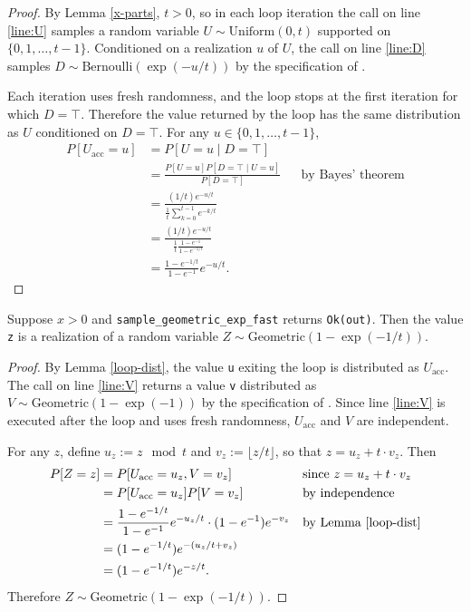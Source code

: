 \documentclass{article}
\begin{document}
\begin{proof}
    By Lemma \ref{x-parts}, $t > 0$, so in each loop iteration the call on line \ref{line:U} samples
    a random variable $U \sim \textrm{Uniform}(0, t)$ supported on $\{0, 1, \dots, t - 1\}$.
    Conditioned on a realization $u$ of $U$, the call on line \ref{line:D} samples
    $D \sim \textrm{Bernoulli}(\exp(-u/t))$ by the specification of
    .

    Each iteration uses fresh randomness, and the loop stops at the first iteration for which $D = \top$.
    Therefore the value returned by the loop has the same distribution as $U$ conditioned on $D = \top$.
    For any $u \in \{0, 1, \dots, t - 1\}$,
    \begin{align*}
        P[U_{\mathrm{acc}} = u]
        &= P[U = u \mid D = \top] \\
        &= \frac{P[U = u] P[D = \top \mid U = u]}{P[D = \top]} && \text{by Bayes' theorem} \\
        &= \frac{(1/t)e^{-u/t}}{\frac{1}{t} \sum_{k=0}^{t-1} e^{-k/t}} \\
        &= \frac{(1/t)e^{-u/t}}{\frac{1}{t}\frac{1 - e^{-1}}{1 - e^{-1/t}}} \\
        &= \frac{1 - e^{-1/t}}{1 - e^{-1}} e^{-u/t}.
    \end{align*}
\end{proof}

\begin{lemma}\label{z-dist}
    Suppose $x > 0$ and \texttt{sample\_geometric\_exp\_fast} returns \texttt{Ok(out)}.
    Then the value \texttt{z} is a realization of a random variable $Z \sim \textrm{Geometric}(1 - \exp(-1/t))$.
\end{lemma}

\begin{proof}
    By Lemma \ref{loop-dist}, the value \texttt{u} exiting the loop is distributed as $U_{\mathrm{acc}}$.
    The call on line \ref{line:V} returns a value \texttt{v} distributed as
    $V \sim \textrm{Geometric}(1 - \exp(-1))$ by the specification of
    .
    Since line \ref{line:V} is executed after the loop and uses fresh randomness, $U_{\mathrm{acc}}$ and $V$ are independent.

    For any $z$, define $u_z := z \mod t$ and $v_z := \lfloor z/t \rfloor$, so that $z = u_z + t \cdot v_z$.
    Then
    \begin{align*}
        P[Z = z]
        &= P[U_{\mathrm{acc}} = u_z, V = v_z] && \text{since } z = u_z + t \cdot v_z \\
        &= P[U_{\mathrm{acc}} = u_z] P[V = v_z] && \text{by independence} \\
        &= \frac{1 - e^{-1/t}}{1 - e^{-1}} e^{-u_z/t} \cdot (1 - e^{-1}) e^{-v_z} && \text{by Lemma \ref{loop-dist}} \\
        &= (1 - e^{-1/t}) e^{-(u_z/t + v_z)} \\
        &= (1 - e^{-1/t}) e^{-z/t}.
    \end{align*}
    Therefore $Z \sim \textrm{Geometric}(1 - \exp(-1/t))$.
\end{proof}
\end{document}

